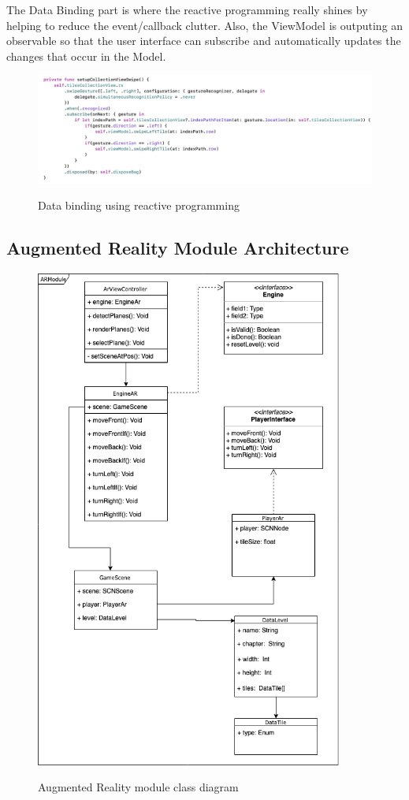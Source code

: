 \documentclass[12 pct]{report}
\begin{document}
The Data Binding part is where the reactive programming really shines by helping to reduce the event/callback clutter. Also, the ViewModel is outputing an observable so that the user interface can subscribe and automatically updates the changes that occur in the Model.


\begin{figure}[H]
\includegraphics[width=1.0\textwidth]{reactive-ui}
\centering
\label{fig:reactive-repository}
\caption{Data binding using reactive programming}
\end{figure}

\subsection*{Augmented Reality Module Architecture}

\begin{figure}[H]
\includegraphics[width=0.9\textwidth]{ArRobotCodeUML}
\centering
\label{fig:feature-points}
\caption{ Augmented Reality module class diagram }
\end{figure}
\end{document}
